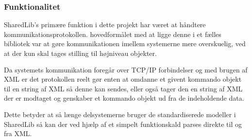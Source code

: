\subsubsection{Funktionalitet}
SharedLib's primære funktion i dette projekt har været at håndtere kommunikationsprotokollen. hovedformålet med at ligge denne i et fælles bibliotek var at gøre kommunikationen imellem systemerne mere overskuelig, ved at der kun skal tages stilling til højniveau objekter.

Da systemets kommunikation foregår over TCP/IP forbindelser og med brugen af XML er det protokollen reelt gør enten at omdanne et givent kommando objekt til en string af XML så denne kan sendes, eller også tager den en string af XML der er modtaget og genskaber et kommando objekt ud fra de indeholdende data.

Dette betyder at så længe delsystemerne bruger de standardiserede modeller i SharedLib så kan der ved hjælp af et simpelt funktionskald parses direkte til og fra XML. 